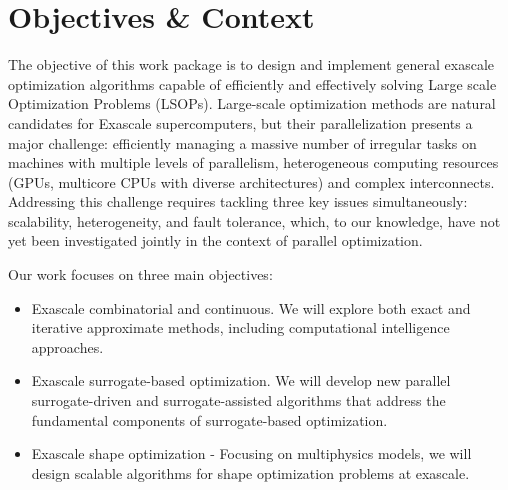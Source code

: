 \section{Objectives \& Context}
The objective of this work package is to design and implement general exascale optimization algorithms capable of efficiently and effectively solving Large scale Optimization Problems (LSOPs). Large-scale optimization methods are natural candidates for Exascale supercomputers, but their parallelization presents a major challenge: efficiently managing a massive number of irregular tasks on machines with multiple levels of parallelism, heterogeneous computing resources (GPUs, multicore CPUs with diverse architectures) and complex interconnects. Addressing this challenge requires tackling three key issues simultaneously: scalability, heterogeneity, and fault tolerance, which, to our knowledge, have not yet been investigated jointly in the context of parallel optimization.

Our work focuses on three main objectives:
\begin{itemize}
\item Exascale combinatorial and continuous. We will explore both exact and iterative approximate methods, including computational intelligence approaches.

\item Exascale surrogate-based optimization. We will develop new parallel surrogate-driven and surrogate-assisted algorithms that address the fundamental components of surrogate-based optimization.

\item Exascale shape optimization - Focusing on multiphysics models, we will design scalable algorithms for shape optimization problems at exascale.

\end{itemize}

